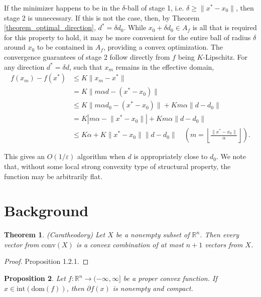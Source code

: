 \documentclass[12pt]{article}
\newtheorem{theorem}{Theorem}
\newtheorem{proposition}[theorem]{Proposition}
\begin{document}
If the minimizer happens to be in the $\delta$-ball of stage 1, i.e. $\delta \ge \lVert x^{\ast} - x_{0} \rVert$, then stage 2 is unnecessary.
If this is not the case, then, by Theorem \ref{theorem_optimal_direction}, $d^{\ast} = \delta d_{0}$.
While $x_{0} + \delta d_{0} \in A_{f}$ is all that is required for this property to hold, it may be more convenient for the entire ball of radius $\delta$ around $x_{0}$ to be contained in $A_{f}$, providing a convex optimization.
The convergence guarantees of stage 2 follow directly from $f$ being $K$-Lipschitz.
For any direction $d^{\ast} = \delta d$, such that $x_{m}$ remains in the effective domain,
\begin{align*}
f(x_{m}) - f(x^{\ast})
&\le K \lVert x_{m} - x^{\ast} \rVert \\
&= K \lVert m \alpha d - (x^{\ast} - x_{0}) \rVert \\
&\le K \lVert m \alpha d_{0} - (x^{\ast} - x_{0}) \rVert  + Km \alpha \lVert d - d_{0} \rVert\\
&= K \left \lvert m \alpha - \lVert x^{\ast} - x_{0} \rVert \right \rvert + Km\alpha \lVert d - d_{0} \rVert \\
&\le K \alpha + K\lVert x^{\ast} - x_{0} \rVert  \lVert d - d_{0} \rVert
\quad \left( m = \left \lfloor \frac{\lVert x^{\ast} - x_{0} \rVert}{\alpha} \right \rfloor  \right).
\end{align*}

This gives an $O( 1/\varepsilon )$ algorithm when $d$ is appropriately close to $d_{0}$.
We note that, without some local strong convexity type of structural property, the function may be arbitrarily flat.


\section{Background}

\begin{theorem}
\label{theorem_caratheodory}
{\rm (Caratheodory)}
Let $X$ be a nonempty subset of $\mathbb{R}^{n}$.
Then every vector from $\mathrm{conv}(X)$ is a convex combination of at most $n+1$ vectors from $X$.
\end{theorem}

\begin{proof}
\cite{Bertsekas2009} Proposition 1.2.1.
\end{proof}

\begin{proposition}
\label{proposition_subgradient_existence}
Let $f : \mathbb{R}^{n} \rightarrow (-\infty,\infty]$ be a proper convex function.
If $x \in \mathrm{int}(\mathrm{dom}(f))$, then $\partial f(x)$ is nonempty and compact.
\end{proposition}
\end{document}
